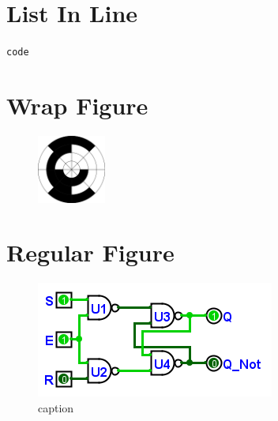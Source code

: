 \section{List In Line}
\lstinline[columns=fixed]|code|


\section{Wrap Figure}
\begin{figure}
	\caption{} %
	\label{BM:fig:gray_code_disc} 
	\centering
	\includegraphics[width=0.2\textwidth]{gfx/gray_code_disc} 
\end{figure}


\section{Regular Figure}
\begin{figure}[H]
	\centering
	\includegraphics[width=\maxwidth{.95\linewidth}]{gfx/09_01}
	\caption{caption}
	\label{fig:09_01}
\end{figure}

